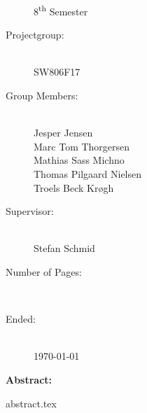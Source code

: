 \begin{titlepage}
\begin{minipage}[t]{0.35\textwidth}
\begin{description}
                8\textsuperscript{th} Semester
            \item[Projectgroup:] \hfill\\
                SW806F17
            \item[Group Members:] \hfill\\
                Jesper Jensen \\
                Marc Tom Thorgersen \\
                Mathias Sass Michno \\
                Thomas Pilgaard Nielsen \\
                Troels Beck Krøgh
            \item[Supervisor:] \hfill\\
                Stefan Schmid
            \item[Number of Pages:] \hfill\\
                \pageref{LastPage}
            \item[Ended:] \hfill\\
                \today
        \end{description}
    \end{minipage} \hfill
    \begin{minipage}[t]{0.55\textwidth}
        \textbf{Abstract:}\\
        \vspace{-1em}
        \begin{problemstatement}
            {abstract.tex}
        \end{problemstatement}
    \end{minipage}
\end{titlepage}
\restoregeometry
